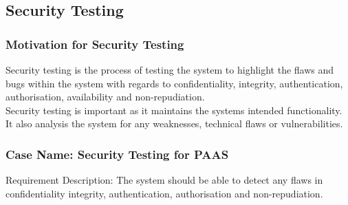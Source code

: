 \documentclass{article}
\begin{document}
\subsection{Security Testing}
\subsubsection{Motivation for Security Testing} 
Security testing is the process of testing the system to highlight the flaws and bugs within the system with regards to confidentiality, integrity, authentication, authorisation, availability and non-repudiation. \\
Security testing is important as it maintains the systems intended functionality. It also analysis the system for any weaknesses, technical flaws or vulnerabilities.\subsubsection{Case Name: Security Testing for PAAS} 
Requirement Description: The system should be able to detect any flaws in confidentiality integrity, authentication, authorisation and non-repudiation. \\
\end{document}
